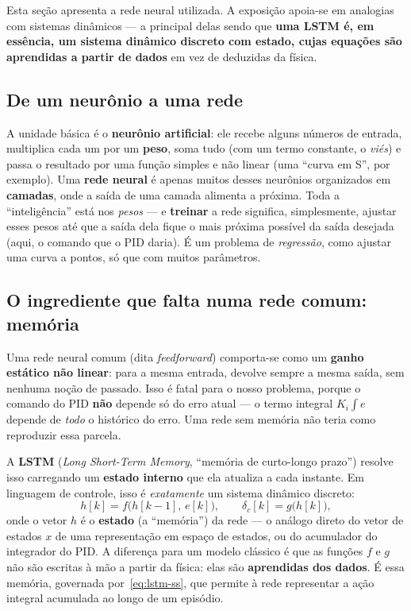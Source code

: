 \documentclass[11pt,a4paper]{article}
\begin{document}
Esta seção apresenta a rede neural utilizada. A exposição apoia-se em analogias com
sistemas dinâmicos --- a principal delas sendo que \textbf{uma LSTM é, em essência, um
sistema dinâmico discreto com estado, cujas equações são aprendidas a partir de dados}
em vez de deduzidas da física.

\subsection{De um neurônio a uma rede}

A unidade básica é o \textbf{neurônio artificial}: ele recebe alguns números de
entrada, multiplica cada um por um \textbf{peso}, soma tudo (com um termo constante, o
\emph{viés}) e passa o resultado por uma função simples e não linear (uma ``curva em S'',
por exemplo). Uma \textbf{rede neural} é apenas muitos desses neurônios organizados em
\textbf{camadas}, onde a saída de uma camada alimenta a próxima. Toda a ``inteligência''
está nos \emph{pesos} --- e \textbf{treinar} a rede significa, simplesmente, ajustar
esses pesos até que a saída dela fique o mais próxima possível da saída desejada (aqui,
o comando que o PID daria). É um problema de \emph{regressão}, como ajustar uma curva a
pontos, só que com muitos parâmetros.

\subsection{O ingrediente que falta numa rede comum: memória}

Uma rede neural comum (dita \emph{feedforward}) comporta-se como um \textbf{ganho
estático não linear}: para a mesma entrada, devolve sempre a mesma saída, sem nenhuma
noção de passado. Isso é fatal para o nosso problema, porque o comando do PID
\textbf{não} depende só do erro atual --- o termo integral $K_i\!\int e$ depende de
\emph{todo} o histórico do erro. Uma rede sem memória não teria como reproduzir essa
parcela.

A \textbf{LSTM} (\emph{Long Short-Term Memory}, ``memória de curto-longo prazo'')
resolve isso carregando um \textbf{estado interno} que ela atualiza a cada instante.
Em linguagem de controle, isso é \emph{exatamente} um sistema dinâmico discreto:
\begin{equation}
  h[k] = f\big(h[k-1],\, e[k]\big), \qquad
  \delta_c[k] = g\big(h[k]\big),
  \label{eq:lstm-ss}
\end{equation}
onde o vetor $h$ é o \textbf{estado} (a ``memória'') da rede --- o análogo direto do
vetor de estados $x$ de uma representação em espaço de estados, ou do acumulador do
integrador do PID. A diferença para um modelo clássico é que as funções $f$ e $g$ não
são escritas à mão a partir da física: elas são \textbf{aprendidas dos dados}. É essa
memória, governada por~\eqref{eq:lstm-ss}, que permite à rede representar a ação
integral acumulada ao longo de um episódio.
\end{document}
